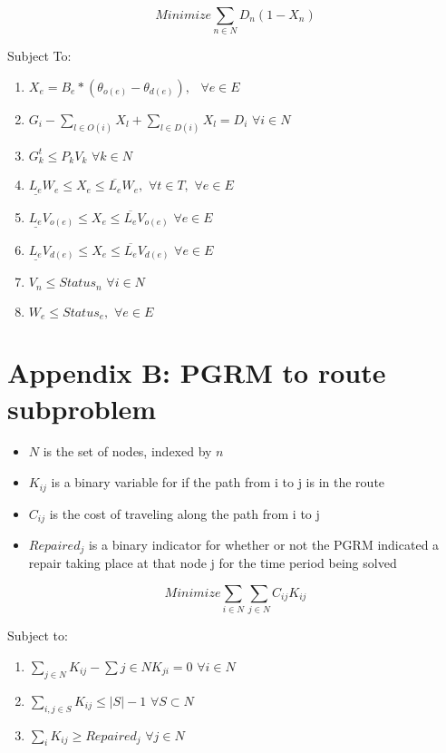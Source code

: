 \documentclass{article}
\begin{document}
$$Minimize \sum_{n \in N} D_n (1-X_n)$$

Subject To:
\begin{enumerate}
	\item $ X_e = B_e * (\theta_{o(e)} - \theta_{d(e)}), \hspace{5pt}  \hspace{4pt} \forall e \in E$
	\item $ G_i - \sum_{l \in O(i)} X_l + \sum_{l \in D(i)} X_l = D_i \hspace{4pt} \forall i \in N$
	\item $G_k^t \leq P_{k} V_{k}  \hspace{4pt} \forall k \in N$
	\item $\underline{L_e}W_{e} \leq X_{e} \leq \overline{L_e}W_{e}, \hspace{4pt} \forall t \in T, \hspace{4pt} \forall e \in E$
	\item $\underline{L_e}V_{o(e)} \leq X_{e} \leq \overline{L_e}V_{o(e)} \hspace{4pt} \forall e \in E$
	\item $\underline{L_e}V_{d(e)} \leq X_{e} \leq \overline{L_e}V_{d(e)} \hspace{4pt} \forall e \in E$
	\item $V_n \leq Status_n \hspace{4pt} \forall i \in N$ 
	\item $W_{e} \leq Status_e, \hspace{4pt} \forall e \in E $
	
\end{enumerate}

\section{Appendix B: PGRM to route subproblem}
\begin{itemize}
		\item $N$ is the set of nodes, indexed by $n$
		\item $K_{ij}$ is a binary variable for if the path from i to j is in the route
		\item $C_{ij}$ is the cost of traveling along the path from i to j
		\item $Repaired_j$ is a binary indicator for whether or not the PGRM indicated a repair taking place at that node j for the time period being solved
\end{itemize}
$$Minimize \sum_{i \in N} \sum_{j \in N} C_{ij}K_{ij}$$

Subject to:
\begin{enumerate}
	\item $\sum_{j \in N} K_{ij} - \sum{j \in N}K_{ji} = 0 \hspace{4pt} \forall i \in N$
	\item $\sum_{i,j \in S} K_{ij} \leq |S|-1 \hspace{4pt} \forall S \subset N$
	\item $\sum_{i} K_{ij} \geq Repaired_j \hspace{4pt} \forall j \in N$
\end{enumerate}
\end{document}

